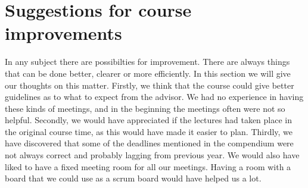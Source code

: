 \section{Suggestions for course improvements}\label{sec:refl_improve}
In any subject there are possibilties for improvement. There are always things that can be done better, clearer or more efficiently. In this section we will give our thoughts on this matter.
\newline
\newline
Firstly, we think that the course could give better guidelines as to what to expect from the advisor. We had no experience in having these kinds of meetings, and in the beginning the meetings often were not so helpful. 
\newline
\newline
Secondly, we would have appreciated if the lectures had taken place in the original course time, as this would have made it easier to plan.
\newline
\newline
Thirdly, we have discovered that some of the deadlines mentioned in the compendium were not always correct and probably lagging from previous year.
\newline
\newline
We would also have liked to have a fixed meeting room for all our meetings. Having a room with a board that we could use as a scrum board would have helped us a lot.
